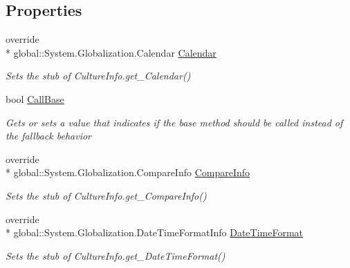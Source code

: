 \subsection*{Properties}
\begin{DoxyCompactItemize}
\item 
override \\*
global\-::\-System.\-Globalization.\-Calendar \hyperlink{class_system_1_1_globalization_1_1_fakes_1_1_stub_culture_info_ab17d4b744aac9a530fb1cdf5c17d5798}{Calendar}
\begin{DoxyCompactList}\small\item\em Sets the stub of Culture\-Info.\-get\-\_\-\-Calendar()\end{DoxyCompactList}\item 
bool \hyperlink{class_system_1_1_globalization_1_1_fakes_1_1_stub_culture_info_ae4fc4a7693b78d0e2b2000e5c6989c91}{Call\-Base}
\begin{DoxyCompactList}\small\item\em Gets or sets a value that indicates if the base method should be called instead of the fallback behavior\end{DoxyCompactList}\item 
override \\*
global\-::\-System.\-Globalization.\-Compare\-Info \hyperlink{class_system_1_1_globalization_1_1_fakes_1_1_stub_culture_info_a9cc4efe88f71da3a3969a79846d5ba35}{Compare\-Info}
\begin{DoxyCompactList}\small\item\em Sets the stub of Culture\-Info.\-get\-\_\-\-Compare\-Info()\end{DoxyCompactList}\item 
override \\*
global\-::\-System.\-Globalization.\-Date\-Time\-Format\-Info \hyperlink{class_system_1_1_globalization_1_1_fakes_1_1_stub_culture_info_ae12bc82e4a539805cf30e4630469635c}{Date\-Time\-Format}
\begin{DoxyCompactList}\small\item\em Sets the stub of Culture\-Info.\-get\-\_\-\-Date\-Time\-Format()\end{DoxyCompactList}\item 

\end{DoxyCompactItemize}
